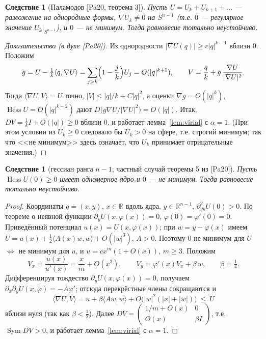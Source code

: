 \documentclass[11pt,a4paper]{article}
\newtheorem{corollary}[theorem]{Следствие}
\theoremstyle{definition}
\newcommand{\R}{\mathbb R}
\DeclareMathOperator{\Hess}{Hess}
\DeclareMathOperator{\Sym}{Sym}
\begin{document}
\begin{corollary}[Паламодов {[Pa20, теорема 3]}]\label{cor:pal}
Пусть $U=U_k+U_{k+1}+\dots$ --- разложение на однородные формы, $\nabla U_k\ne0$ на $S^{n-1}$ (т.е.
$0$ --- регулярное значение $U_k|_{S^{n-1}}$), и $0$ --- не минимум. Тогда равновесие тотально
неустойчиво.
\end{corollary}
\begin{proof}[Доказательство (в духе {[Pa20]})]
Из однородности $|\nabla U(q)|\ge c|q|^{k-1}$ вблизи $0$. Положим
\[
g=U-\tfrac1k\langle q,\nabla U\rangle=\sum_{j>k}\Bigl(1-\frac jk\Bigr)U_j=O(|q|^{k+1}),\qquad
V=\frac qk+g\,\frac{\nabla U}{|\nabla U|^2}.
\]
Тогда $\langle\nabla U,V\rangle=U$ точно, $|V|\le|q|/k+C|q|^2$, а оценки $\nabla g=O(|q|^k)$,
$\Hess U=O(|q|^{k-2})$ дают $D\bigl(g\nabla U/|\nabla U|^2\bigr)=O(|q|)$. Итак, $DV=\frac1kI+O(|q|)\ge0$
вблизи $0$, и работает лемма~\ref{lem:virial} с $\alpha=1$. (При этом условии из $U_k\ge0$ следовало бы
$U_k>0$ на сфере, т.е. строгий минимум; так что <<не минимум>> здесь означает, что $U_k$ принимает
отрицательные значения.)
\end{proof}

\begin{corollary}[гессиан ранга $n-1$; частный случай теоремы 5 из {[Pa20]}]\label{cor:rank}
Пусть $\Hess U(0)\ge0$ имеет одномерное ядро и $0$ --- не минимум. Тогда равновесие тотально неустойчиво.
\end{corollary}
\begin{proof}
Координаты $q=(x,y)$, $x\in\R$ вдоль ядра, $y\in\R^{n-1}$, $\partial^2_{yy}U(0)>0$. По теореме о неявной
функции $\partial_yU(x,\varphi(x))=0$, $\varphi(0)=\varphi'(0)=0$. Приведённый потенциал $u(x)=U(x,\varphi(x))$;
при $w=y-\varphi(x)$ имеем $U=u(x)+\frac12\langle A(x)w,w\rangle+O(|w|^3)$, $A>0$. Поэтому $0$ не минимум
для $U$ $\iff$ не минимум для $u$, и $u=cx^m(1+O(x))$, $m\ge3$. Положим
\[
V_x=\frac{u(x)}{u'(x)}=\frac xm+O(x^2),\qquad V_y=\varphi'(x)V_x+\beta\,w,\qquad \beta=\tfrac14 .
\]
Дифференцируя тождество $\partial_yU(x,\varphi(x))=0$, получаем $\partial_x\partial_yU(x,\varphi)=-A\varphi'$;
отсюда перекрёстные члены сокращаются и
\[
\langle\nabla U,V\rangle=u+\beta\langle Aw,w\rangle+O\bigl(|w|^2(|x|+|w|)\bigr)\ \le\ U
\]
вблизи нуля (так как $\beta<\frac12$). Далее $DV=\begin{pmatrix}1/m+O(x)&0\\ O(x)&\beta I\end{pmatrix}$, т.е.
$\Sym DV>0$, и работает лемма~\ref{lem:virial} с $\alpha=1$.
\end{proof}
\end{document}
